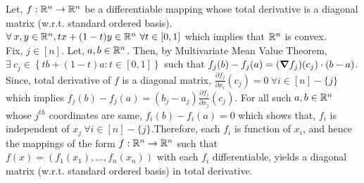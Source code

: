 \begin{soln}{7}
  Let, $ f:\mathbb{R}^n \to \mathbb{R}^n $ be a differentiable mapping whose total derivative is a diagonal matrix (w.r.t. standard ordered basis).
    \\ 
  $ \forall \: x,y \in \R^n, tx+(1-t)y \in \R^n \ \forall t \in [0,1] $ which implies that $ \mathbb{R}^n $ is convex. \\ 
  Fix, $ j\in [n] $. Let, $ a,b \in \mathbb{R}^n $. Then, by Multivariate Mean Value Theorem, $\exists \: c_j \in \left\{ tb+(1-t)a : t \in [0,1] \right\} $ such that $ f_j(b) - f_j(a) = (\grad f_j)(c_j) \cdot (b-a) $. Since, total derivative of $ f $ is a diagonal matrix, $ \frac{\partial f_j}{\partial x_i}(c_j) = 0 \ \forall i \in [n]-\{j\}$ which implies $ f_j(b) - f_j(a) = (b_j-a_j)\frac{\partial f_j}{\partial x_j}(c_j) $. For all such $ a,b \in \mathbb{R}^n $ whose $ j^{th} $ coordinates are same, $ f_i(b) - f_i(a) = 0 $ which shows that, $ f_i $ is independent of $ x_j \ \forall i \in [n]-\{j\}$.Therefore, each $ f_i $ is function of $ x_i $, and hence the mappings of the form $ f:\mathbb{R}^n \to \mathbb{R}^n $ such that $ f(x)=(f_1(x_1),\ldots,f_n(x_n)) $ with each $ f_i $ differentiable, yields a diagonal matrix (w.r.t. standard ordered basis) in total derivative.
\end{soln}